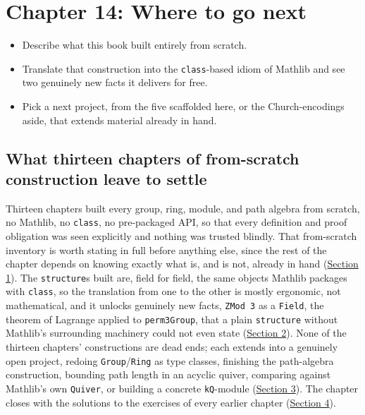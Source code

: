\chapter{Chapter 14: Where to go next}\label{sec:14-next-steps:00-index:1}

\begin{learningobjectives}
\begin{itemize}
\tightlist
\item
  Describe what this book built entirely from scratch.
\item
  Translate that construction into the \texttt{class}-based idiom of Mathlib and see two genuinely new facts it delivers for free.
\item
  Pick a next project, from the five scaffolded here, or the Church-encodings aside, that extends material already in hand.
\end{itemize}
\end{learningobjectives}


\section*{What thirteen chapters of from-scratch construction leave to settle}\label{sec:14-next-steps:00-index:2}

Thirteen chapters built every group, ring, module, and path algebra from scratch, no Mathlib, no \texttt{class}, no pre-packaged API, so that every definition and proof obligation was seen explicitly and nothing was trusted blindly. That from-scratch inventory is worth stating in full before anything else, since the rest of the chapter depends on knowing exactly what is, and is not, already in hand (\hyperref[sec:14-next-steps:01-what-we-built:1]{Section 1}). The \texttt{structure}s built are, field for field, the same objects Mathlib packages with \texttt{class}, so the translation from one to the other is mostly ergonomic, not mathematical, and it unlocks genuinely new facts, \texttt{ZMod 3} as a \texttt{Field}, the theorem of Lagrange applied to \texttt{perm3Group}, that a plain \texttt{structure} without Mathlib's surrounding machinery could not even state (\hyperref[sec:14-next-steps:02-moving-to-mathlib:1]{Section 2}). None of the thirteen chapters' constructions are dead ends; each extends into a genuinely open project, redoing \texttt{Group}/\texttt{Ring} as type classes, finishing the path-algebra construction, bounding path length in an acyclic quiver, comparing against Mathlib's own \texttt{Quiver}, or building a concrete \texttt{kQ}-module (\hyperref[sec:14-next-steps:03-next-projects:1]{Section 3}). The chapter closes with the solutions to the exercises of every earlier chapter (\hyperref[sec:14-next-steps:04-solutions:1]{Section 4}).






